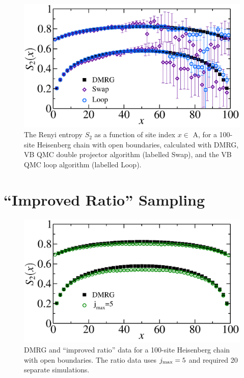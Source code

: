 \begin{figure} {
	\includegraphics[width=6in]{./figures/paper2/fig_1D/loopfig.pdf} 
	\caption[Renyi for 100 site chain with loop algorithm data]{ 
	\label{loopfig}
The Renyi entropy $S_2$ as a function of site index $x \in $ A, for a 100-site Heisenberg chain with open boundaries, 
calculated with DMRG, VB QMC double projector algorithm (labelled Swap), and the VB QMC loop algorithm (labelled Loop).
}
}\end{figure}


	

\section{``Improved Ratio'' Sampling}


\begin{figure} {
	\includegraphics[width=6in]{./figures/paper2/fig_1D/ratiofig.pdf} 
	\centering
	\caption[Renyi for 100 site chain with ratio data]{ 
	\label{ratiofig}
	DMRG and ``improved ratio'' data for a 100-site Heisenberg chain with open boundaries.
The ratio data uses $j_{\rm max}=5$ and required 20 separate simulations.
	}
}\end{figure}

